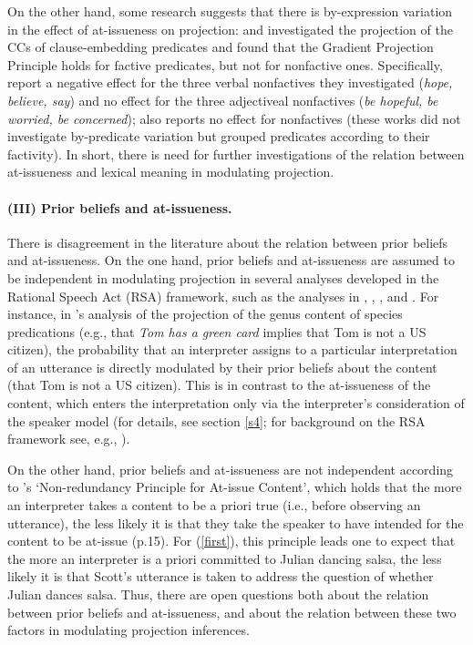 \documentclass[11pt,fleqn]{article}
\newcommand{\6}{\mbox{$[\hspace*{-.6mm}[$}}
\newcommand{\9}{\mbox{$]\hspace*{-.6mm}]$}}
\newcommand{\citepos}[1]{\citeauthor{#1}'s \citeyear{#1}}
\begin{document}
On the other hand, some research suggests that there is by-expression variation in the effect of at-issueness on projection: \citealt*{djaerv-bacovcin-salt27, djaerv-bacovcin2020} and \citealt{mahler-etal2020} investigated the projection of the CCs of clause-embedding predicates and found that the Gradient Projection Principle holds for factive predicates, but not for nonfactive ones. Specifically, \citealt{djaerv-bacovcin2020} report a negative effect for the three verbal nonfactives they investigated ({\em hope, believe, say}) and no effect for the three adjectiveal nonfactives ({\em be hopeful, be worried, be concerned}); \citealt{mahler-etal2020} also reports no effect for nonfactives (these works did not investigate by-predicate variation but grouped predicates according to their factivity). In short, there is need for further investigations of the relation between at-issueness and lexical meaning in modulating projection.

\paragraph{(III) Prior beliefs and at-issueness.} There is disagreement in the literature about the relation between prior beliefs and at-issueness. On the one hand, prior beliefs and at-issueness are assumed to be independent in modulating projection in several analyses developed in the Rational Speech Act (RSA) framework, such as the analyses in \citealt*{qing-etal2016}, \citealt*{stevens-etal2017}, \citealt{warstadt2022}, and \citealt{pan-degen2023}. For instance, in \citepos{warstadt2022} analysis of the projection of the genus content of species predications (e.g., that {\em Tom has a green card} implies that Tom is not a US citizen), the probability that an interpreter assigns to a particular interpretation of an utterance is directly modulated by their prior beliefs about the content (that Tom is not a US citizen). This is in contrast to the at-issueness of the content, which enters the interpretation only via the interpreter's consideration of the speaker model (for details, see section \ref{s4}; for background on the RSA framework see, e.g., \citealt{degen2023-RSA}). 

On the other hand, prior beliefs and at-issueness are not independent according to \citepos{tonhauser-etal-eval} `Non-redundancy Principle for At-issue Content', which holds that the more an interpreter takes a content to be a priori true (i.e., before observing an utterance), the less likely it is that they take the speaker to have intended for the content to be at-issue (p.15).  For (\ref{first}), this principle leads one to expect that the more an interpreter is a priori committed to Julian dancing salsa, the less likely it is that Scott's utterance is taken to address the question of whether Julian dances salsa.  Thus, there are open questions both about the relation between prior beliefs and at-issueness, and about the relation between these two factors in modulating projection inferences.
\end{document}
